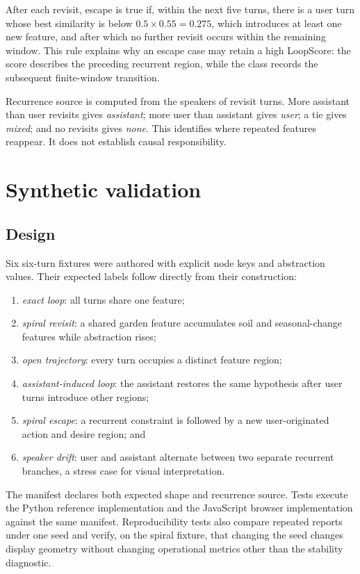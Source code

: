 \documentclass[11pt]{article}
\begin{document}
After each revisit, escape is true if, within the next five turns, there is a
user turn whose best similarity is below $0.5\times0.55=0.275$, which introduces
at least one new feature, and after which no further revisit occurs within the
remaining window. This rule explains why an escape case may retain a high
LoopScore: the score describes the preceding recurrent region, while the class
records the subsequent finite-window transition.

Recurrence source is computed from the speakers of revisit turns. More
assistant than user revisits gives \emph{assistant}; more user than assistant
gives \emph{user}; a tie gives \emph{mixed}; and no revisits gives \emph{none}.
This identifies where repeated features reappear. It does not establish causal
responsibility.

\section{Synthetic validation}

\subsection{Design}

Six six-turn fixtures were authored with explicit node keys and abstraction
values. Their expected labels follow directly from their construction:

\begin{enumerate}
  \item \emph{exact loop}: all turns share one feature;
  \item \emph{spiral revisit}: a shared garden feature accumulates soil and
        seasonal-change features while abstraction rises;
  \item \emph{open trajectory}: every turn occupies a distinct feature region;
  \item \emph{assistant-induced loop}: the assistant restores the same
        hypothesis after user turns introduce other regions;
  \item \emph{spiral escape}: a recurrent constraint is followed by a new
        user-originated action and desire region; and
  \item \emph{speaker drift}: user and assistant alternate between two separate
        recurrent branches, a stress case for visual interpretation.
\end{enumerate}

The manifest declares both expected shape and recurrence source. Tests execute
the Python reference implementation and the JavaScript browser implementation
against the same manifest. Reproducibility tests also compare repeated reports
under one seed and verify, on the spiral fixture, that changing the seed changes
display geometry without changing operational metrics other than the stability
diagnostic.
\end{document}

